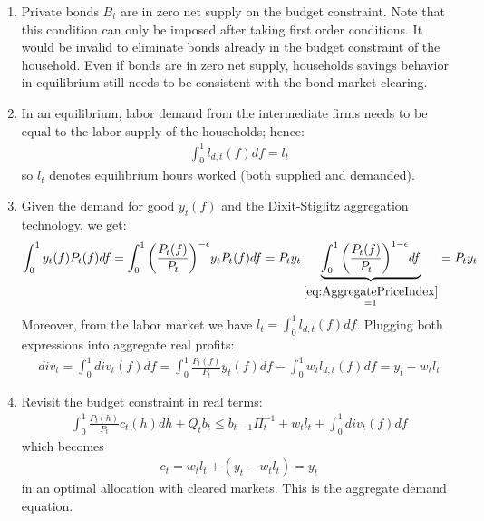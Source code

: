 \begin{enumerate}
\item Private bonds \(B_t\) are in zero net supply on the budget constraint.
Note that this condition can only be imposed after taking first order conditions.
It would be invalid to eliminate bonds already in the budget constraint of the household.
Even if bonds are in zero net supply, households savings behavior in equilibrium still needs to be consistent with the bond market clearing.
	
\item In an equilibrium, labor demand from the intermediate firms needs to be equal to the labor supply of the households; hence:
\begin{align}
	\int_{0}^1 l_{d,t}(f) df = l_t
\end{align}
so \(l_t\) denotes equilibrium hours worked (both supplied and demanded).

\item Given the demand for good \(y_t(f)\) and the Dixit-Stiglitz aggregation technology, we get:
\begin{align*}
	\int_0^1 y_t(f) P_t(f) df = \int_0^1 {\left(\frac{P_t(f)}{P_t}\right)}^{-\epsilon} y_t P_t(f) df = P_t y_t \underbrace{\int_0^1 {\left(\frac{P_t(f)}{P_t}\right)}^{1-\epsilon}  df}_{\overset{\eqref{eq:AggregatePriceIndex}}{=1}} = P_t y_t
\end{align*}
Moreover, from the labor market we have \(l_t = \int_{0}^1 l_{d,t}(f) df\).
Plugging both expressions into aggregate real profits:
\begin{align*}
	div_t = \int_0^1 div_t(f) df = \int_0^1 \frac{P_t(f)}{P_t} y_t(f) df - \int_0^1 w_t l_{d,t}(f) df = y_t - w_t l_t
\end{align*}

\item Revisit the budget constraint in real terms:
\begin{align*}
	\int_0^1 \frac{P_t(h)}{P_t} c_t(h) dh + Q_t b_t \leq b_{t-1}\Pi_t^{-1} + w_t l_t + \int_0^1 div_t(f) df
\end{align*}
which becomes
\begin{align*}
	c_t = w_t l_t + (y_t - w_t l_t) = y_t
\end{align*}
in an optimal allocation with cleared markets. This is the aggregate demand equation.
	

\end{enumerate}
